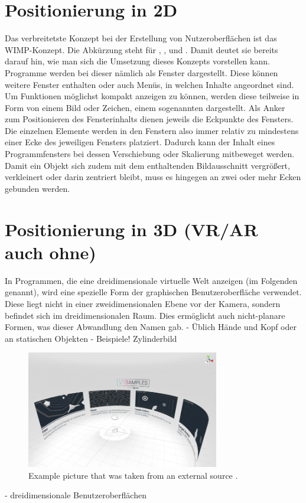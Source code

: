 	\section{Positionierung in 2D}
		Das verbreitetste Konzept bei der Erstellung von Nutzeroberflächen ist das WIMP-Konzept. Die Abkürzung steht für , ,  und . 
		Damit deutet sie bereits darauf hin, wie man sich die Umsetzung dieses Konzepts vorstellen kann. Programme werden bei dieser nämlich als Fenster dargestellt. Diese können weitere Fenster enthalten oder auch Menüs, in welchen Inhalte angeordnet sind. Um Funktionen möglichst kompakt anzeigen zu können, werden diese teilweise in Form von einem Bild oder Zeichen, einem sogenannten  dargestellt.
		Als Anker zum Positionieren des Fensterinhalts dienen jeweils die Eckpunkte des Fensters. Die einzelnen Elemente werden in den Fenstern also immer relativ zu mindestens einer Ecke des jeweiligen Fensters platziert. Dadurch kann der Inhalt eines Programmfensters bei dessen Verschiebung oder Skalierung mitbeweget werden. Damit ein Objekt sich zudem mit dem enthaltenden Bildausschnitt vergrößert, verkleinert oder darin zentriert bleibt, muss es hingegen an zwei oder mehr Ecken gebunden werden.
		
		
		
	\section{Positionierung in 3D (VR/AR auch ohne)}
		
		In Programmen, die eine dreidimensionale virtuelle Welt anzeigen (im Folgenden  genannt), wird eine spezielle Form der graphischen Benutzeroberfläche verwendet. Diese liegt nicht in einer zweidimensionalen Ebene vor der Kamera, sondern befindet sich im dreidimensionalen Raum. Dies ermöglicht auch nicht-planare Formen, was dieser Abwandlung den Namen  gab.
		- Üblich Hände und Kopf oder an statischen Objekten
		- Beispiele! Zylinderbild
		
		\begin{figure}[htbp]
			\centering
			\includegraphics[width=0.75\textwidth]{figures/cylinder_mapping.png}
			\caption{Example picture that was taken from an external source .}
			\label{fig:cylinder_mapping}
		\end{figure}
		- dreidimensionale Benutzeroberflächen